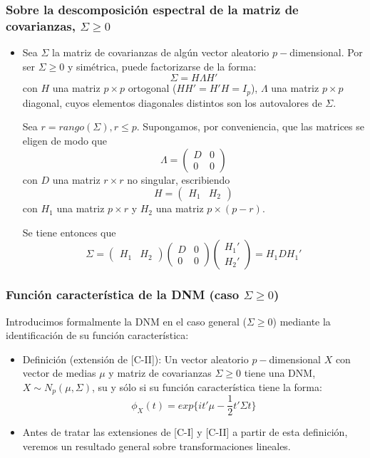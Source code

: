 \documentclass[11pt,a4paper]{article}
\begin{document}
\subsubsection{Sobre la descomposición espectral de la matriz de covarianzas, \texorpdfstring{$\Sigma \geq 0$})}
\begin{itemize}
\item Sea $\Sigma$ la matriz de covarianzas de algún vector aleatorio $p-$dimensional. Por ser $\Sigma \geq 0$ y simétrica, puede factorizarse de la forma:
$$\Sigma = H \Lambda H'$$
con $H$ una matriz $p \times p$ ortogonal ($HH' = H'H = I_{p}$), $\Lambda$ una matriz $p \times p$ diagonal, cuyos elementos diagonales distintos son los autovalores de $\Sigma$.

Sea $r = rango(\Sigma), r \leq p$. Supongamos, por conveniencia, que las matrices se eligen de modo que
$$\Lambda = \begin{pmatrix}
D & 0 \\
0 & 0
\end{pmatrix}$$
con $D$ una matriz $r \times r$ no singular, escribiendo
$$H = \begin{pmatrix} H_{1} & H_{2} \end{pmatrix}$$
con $H_{1}$ una matriz $p \times r$ y $H_{2}$ una matriz $p \times (p - r)$.

Se tiene entonces que
$$\Sigma = \begin{pmatrix} H_{1} & H_{2} \end{pmatrix} \begin{pmatrix}
D & 0 \\
0 & 0
\end{pmatrix} \begin{pmatrix} H_{1}' \\ H_{2}' \end{pmatrix} = H_{1} D H_{1}'$$
\end{itemize}

\subsubsection{Función característica de la DNM (caso \texorpdfstring{$\Sigma \geq 0$}))}
Introducimos formalmente la DNM en el caso general ($\Sigma \geq 0$) mediante la identificación de su función característica:

\begin{itemize}
\item Definición (extensión de [C-II]): Un vector aleatorio $p-$dimensional $X$ con vector de medias $\mu$ y matriz de covarianzas $\Sigma \geq 0$ tiene una DNM, $X \sim N_{p}(\mu, \Sigma)$, su y sólo si su función característica tiene la forma:
$$\phi_{X}(t) = exp\{it'\mu - \frac{1}{2}t' \Sigma t\}$$

\item Antes de tratar las extensiones de [C-I] y [C-II] a partir de esta definición, veremos un resultado general sobre transformaciones lineales.
\end{itemize}
\end{document}
